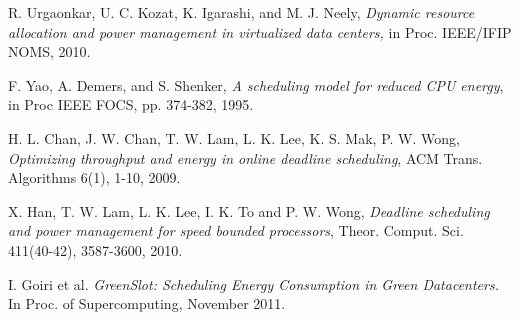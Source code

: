 \documentclass[10pt,conference,compsocconf,letterpaper]{IEEEtran}
\begin{document}
{{\begin{thebibliography}{1}
R. Urgaonkar, U. C. Kozat, K. Igarashi, and M. J. Neely, \emph{Dynamic resource allocation and power management in virtualized data centers,} in Proc. IEEE/IFIP NOMS, 2010.


F. Yao, A. Demers, and S. Shenker, \emph{A scheduling model for reduced CPU energy}, in Proc IEEE FOCS, pp. 374-382, 1995.

H. L. Chan, J. W. Chan, T. W. Lam, L. K. Lee, K. S. Mak, P. W. Wong, \emph{Optimizing throughput and energy in online deadline scheduling}, ACM Trans. Algorithms 6(1), 1-10, 2009.

X. Han, T. W. Lam, L. K. Lee, I. K. To and P. W. Wong, \emph{Deadline scheduling and power management for speed bounded processors}, Theor. Comput. Sci. 411(40-42), 3587-3600, 2010.

 I. Goiri et al. \emph{GreenSlot: Scheduling Energy Consumption in
Green Datacenters.} In Proc. of Supercomputing, November 2011.



\end{thebibliography}

}}
\end{document}
